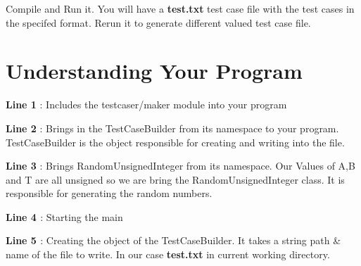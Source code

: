 \begin{DoxyCode}{0}
\DoxyCodeLine{\textcolor{preprocessor}{\#include <testcaser/maker>}}
\DoxyCodeLine{}
\DoxyCodeLine{}
\DoxyCodeLine{}
\DoxyCodeLine{}
\DoxyCodeLine{}
\DoxyCodeLine{\}}
\DoxyCodeLine{}
\DoxyCodeLine{}
\DoxyCodeLine{\}}
\end{DoxyCode}


Compile and Run it. You will have a {\bfseries{test.\+txt}} test case file with the test cases in the specifed format. Rerun it to generate different valued test case file. 

\hypertarget{index_under_standing}{}\section{Understanding Your Program}\label{index_under_standing}
{\bfseries{Line 1}} \+: Includes the {\ttfamily testcaser/maker} module into your program

{\bfseries{Line 2}} \+: Brings in the Test\+Case\+Builder from its namespace to your program. Test\+Case\+Builder is the object responsible for creating and writing into the file.

{\bfseries{Line 3}} \+: Brings Random\+Unsigned\+Integer from its namespace. Our Values of A,B and T are all unsigned so we are bring the Random\+Unsigned\+Integer class. It is responsible for generating the random numbers.

{\bfseries{Line 4 }} \+: Starting the main

{\bfseries{Line 5 }} \+: Creating the object of the Test\+Case\+Builder. It takes a string path \& name of the file to write. In our case {\bfseries{test.\+txt}} in current working directory.


